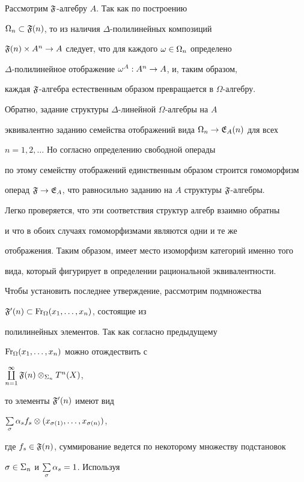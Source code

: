 \begin{pf}


Рассмотрим $\frak F$-алгебру $A$. Так как по построению


$\Omega_n\subset \frak F(n)$, то из наличия $\Delta$-полилинейных композиций


$\frak F(n)\times A^n\to A$ следует, что для каждого $\omega\in \Omega_n$ определено


$\Delta$-полилинейное отображение $\omega^A: A^n\to A$, и, таким образом,


каждая $\frak F$-алгебра естественным образом превращается в $\Omega$-алгебру.


Обратно, задание структуры $\Delta$-линейной $\Omega$-алгебры на $A$


эквивалентно заданию семейства отображений вида $\Omega_n\to \frak E_A(n)$ для всех


$n=1,2,\dotsc$ Но согласно определению свободной операды


по этому семейству отображений единственным образом строится гомоморфизм


операд $\frak F\to \frak E_A$, что равносильно заданию на $A$ структуры $\frak F$-алгебры.


Легко проверяется, что эти соответствия структур алгебр взаимно обратны


и что в обоих случаях гомоморфизмами являются одни и те же


отображения. Таким образом, имеет место изоморфизм категорий именно того


вида, который фигурирует в определении рациональной эквивалентности.





Чтобы установить последнее утверждение, рассмотрим подмножества


$\frak F'(n)\subset \operatorname{Fr}_{\Omega}(x_1,\dotsc,x_n)$, состоящие из


полилинейных элементов. Так как согласно предыдущему


$\operatorname{Fr}_{\Omega}(x_1,\dotsc,x_n)$ можно отождествить с


$\coprod\limits_{n=1}^{\infty} \frak F(n)\otimes_{\Sigma_n} T^n(X)$,


то элементы $\frak F'(n)$ имеют вид


$\sum\limits_{\sigma} \alpha_s f_s\otimes (x_{\sigma(1)},\dotsc,x_{\sigma(n)})$,


где $f_s\in \frak F(n)$, суммирование ведется по некоторому множеству подстановок


$\sigma\in \Sigma_n$ и $\sum\limits_{\sigma} \alpha_s=1$. Используя



\end{pf}
